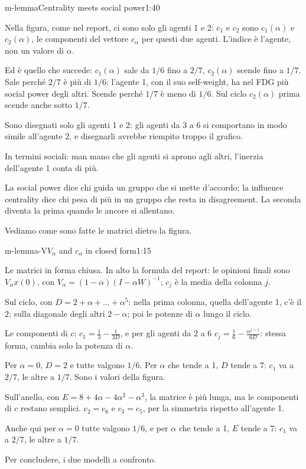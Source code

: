 \begin{slidetre}{m-lemma}{Centrality meets social power}{1:40}
\begin{discorso}
    \item \clic Nella figura, come nel report, ci sono solo gli agenti 1 e 2: $c_1$ e $c_2$ sono $c_1(\alpha)$ e $c_2(\alpha)$, le componenti del vettore $c_\alpha$ per questi due agenti. L'indice è l'agente, non un valore di $\alpha$.
    \item Ed è quello che succede: $c_1(\alpha)$ sale da $1/6$ fino a $2/7$, $c_2(\alpha)$ scende fino a $1/7$. Sale perché $2/7$ è più di $1/6$: l'agente 1, con il suo self-weight, ha nel FDG più social power degli altri. Scende perché $1/7$ è meno di $1/6$. Sul ciclo $c_2(\alpha)$ prima scende anche sotto $1/7$.
    \item Sono disegnati solo gli agenti 1 e 2: gli agenti da 3 a 6 si comportano in modo simile all'agente 2, e disegnarli avrebbe riempito troppo il grafico.
    \item In termini sociali: man mano che gli agenti si aprono agli altri, l'inerzia dell'agente 1 conta di più.
    \item La social power dice chi guida un gruppo che si mette d'accordo; la influence centrality dice chi pesa di più in un gruppo che resta in disagreement. La seconda diventa la prima quando le ancore si allentano.
    \item Vediamo come sono fatte le matrici dietro la figura.
  \end{discorso}
\end{slidetre}

\begin{slidedue}{m-lemma-V}{$V_\alpha$ and $c_\alpha$ in closed form}{1:15}
  \begin{discorso}
    \item Le matrici in forma chiusa. In alto la formula del report: le opinioni finali sono $V_\alpha x(0)$, con $V_\alpha=(1-\alpha)(I-\alpha W)^{-1}$; $c_j$ è la media della colonna $j$.
    \item Sul ciclo, con $D=2+\alpha+\dots+\alpha^5$: nella prima colonna, quella dell'agente 1, c'è il 2; sulla diagonale degli altri $2-\alpha$; poi le potenze di $\alpha$ lungo il ciclo.
    \item Le componenti di $c$: $c_1=\frac13-\frac{1}{3D}$, e per gli agenti da 2 a 6 $c_j=\frac16-\frac{\alpha^{j-1}}{6D}$: stessa forma, cambia solo la potenza di $\alpha$.
    \item Per $\alpha=0$, $D=2$ e tutte valgono $1/6$. Per $\alpha$ che tende a 1, $D$ tende a 7: $c_1$ va a $2/7$, le altre a $1/7$. Sono i valori della figura.
    \item \clic Sull'anello, con $E=8+4\alpha-4\alpha^2-\alpha^3$, la matrice è più lunga, ma le componenti di $c$ restano semplici. $c_2=c_6$ e $c_3=c_5$, per la simmetria rispetto all'agente 1.
    \item Anche qui per $\alpha=0$ tutte valgono $1/6$, e per $\alpha$ che tende a 1, $E$ tende a 7: $c_1$ va a $2/7$, le altre a $1/7$.
    \item Per concludere, i due modelli a confronto.
  \end{discorso}
\end{slidedue}

